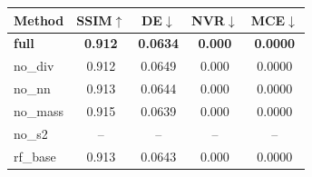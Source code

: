 \begin{tabular}{lcccc}
\toprule
\textbf{Method} & SSIM$\uparrow$ & DE$\downarrow$ & NVR$\downarrow$ & MCE$\downarrow$ \\
\midrule
\textbf{full} & \textbf{0.912} & \textbf{0.0634} & \textbf{0.000} & \textbf{0.0000} \\
no_div & 0.912 & 0.0649 & 0.000 & 0.0000 \\
no_nn & 0.913 & 0.0644 & 0.000 & 0.0000 \\
no_mass & 0.915 & 0.0639 & 0.000 & 0.0000 \\
no_s2 & -- & -- & -- & -- \\
rf_base & 0.913 & 0.0643 & 0.000 & 0.0000 \\
\bottomrule
\end{tabular}
